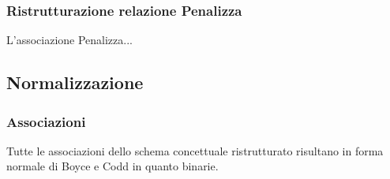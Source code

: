\documentclass[11pt]{article}
\begin{document}
\subsubsection{Ristrutturazione relazione Penalizza}
L'associazione Penalizza...

\begin{figure}[H]
    \centering
\end{figure}

\subsection{Normalizzazione}
\subsubsection{Associazioni}
Tutte le associazioni dello schema concettuale ristrutturato risultano in forma normale di Boyce e Codd in quanto binarie.
\end{document}
